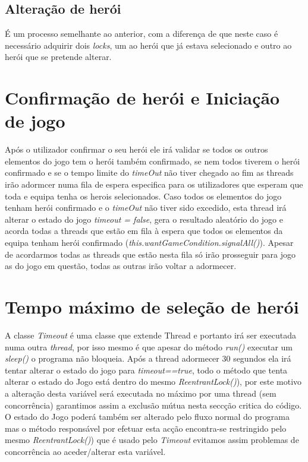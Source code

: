 \subsection{Alteração de herói }
É um processo semelhante ao anterior, com a diferença de que neste caso é necessário adquirir dois \textit{locks}, um ao herói que já estava selecionado e outro ao herói que se pretende alterar. 


\section{Confirmação de herói e Iniciação de jogo}

Após o utilizador confirmar o seu herói ele irá validar se todos os outros elementos do jogo tem o herói também confirmado, se nem todos tiverem o herói confirmado e se o tempo limite do \textit{timeOut} não tiver chegado ao fim as threads irão adormcer numa fila de espera especifica para os utilizadores que esperam que toda e equipa tenha os herois selecionados. Caso todos os elementos do jogo tenham herói confirmado e o \textit{timeOut} não tiver sido excedido, esta thread irá alterar o estado do jogo \textit{timeout = false}, gera o resultado aleatório do jogo e acorda todas a threads que estão em fila à espera que todos os elementos da equipa tenham herói confirmado (\textit{this.wantGameCondition.signalAll()}). Apesar de acordarmos todas as threads que estão nesta fila só irão prosseguir para jogo as do jogo em questão, todas as outras irão voltar a adormecer. 

\section{Tempo máximo de seleção de herói}

A classe \textit{Timeout} é uma classe que extende Thread e portanto irá ser executada numa outra \textit{thread}, por isso mesmo é que apesar do método \textit{run()} executar um \textit{sleep()} o programa não bloqueia. Após a thread adormecer 30 segundos ela irá tentar alterar o estado do jogo para \textit{timeout==true}, todo o método que tenta alterar o estado do Jogo está dentro do mesmo \textit{ReentrantLock()}), por este motivo a alteração desta variável será executada no máximo por uma thread (sem concorrência) garantimos assim a exclusão mútua nesta seccção critica do código. O estado do Jogo poderá também ser alterado pelo fluxo normal do programa mas o método responsável por efetuar esta acção encontra-se restringido pelo mesmo \textit{ReentrantLock()}) que é usado pelo \textit{Timeout} evitamos assim problemas de concorrência ao aceder/alterar esta variável. 

